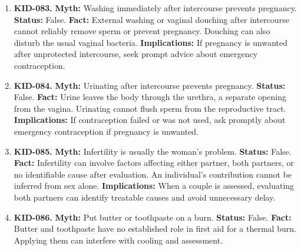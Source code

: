 \documentclass[11pt,oneside]{book}
\begin{document}
\begin{enumerate}[leftmargin=0pt,labelwidth=0pt,labelsep=0pt,itemindent=0pt]
\textbf{Status:} False.\newline
\textbf{Fact:} Many sexually transmitted infections cause no symptoms, and different infections can cause similar symptoms. Testing is often the only way to identify an infection. \cite{ref176}\newline
\textbf{Implications:} Seek advice after a possible exposure even if you feel well. The appropriate tests and timing depend on the exposure.
\item[] \textbf{KID-083.} \textbf{Myth:} Washing immediately after intercourse prevents pregnancy.\newline
\textbf{Status:} False.\newline
\textbf{Fact:} External washing or vaginal douching after intercourse cannot reliably remove sperm or prevent pregnancy. Douching can also disturb the usual vaginal bacteria. \cite{ref321}\newline
\textbf{Implications:} If pregnancy is unwanted after unprotected intercourse, seek prompt advice about emergency contraception.
\item[] \textbf{KID-084.} \textbf{Myth:} Urinating after intercourse prevents pregnancy.\newline
\textbf{Status:} False.\newline
\textbf{Fact:} Urine leaves the body through the urethra, a separate opening from the vagina. Urinating cannot flush sperm from the reproductive tract. \cite{ref369}\newline
\textbf{Implications:} If contraception failed or was not used, ask promptly about emergency contraception if pregnancy is unwanted.
\item[] \textbf{KID-085.} \textbf{Myth:} Infertility is usually the woman's problem.\newline
\textbf{Status:} False.\newline
\textbf{Fact:} Infertility can involve factors affecting either partner, both partners, or no identifiable cause after evaluation. An individual's contribution cannot be inferred from sex alone. \cite{ref187}\newline
\textbf{Implications:} When a couple is assessed, evaluating both partners can identify treatable causes and avoid unnecessary delay.
\item[] \textbf{KID-086.} \textbf{Myth:} Put butter or toothpaste on a burn.\newline
\textbf{Status:} False.\newline
\textbf{Fact:} Butter and toothpaste have no established role in first aid for a thermal burn. Applying them can interfere with cooling and assessment. \cite{ref370}\newline

\end{enumerate}
\end{document}
